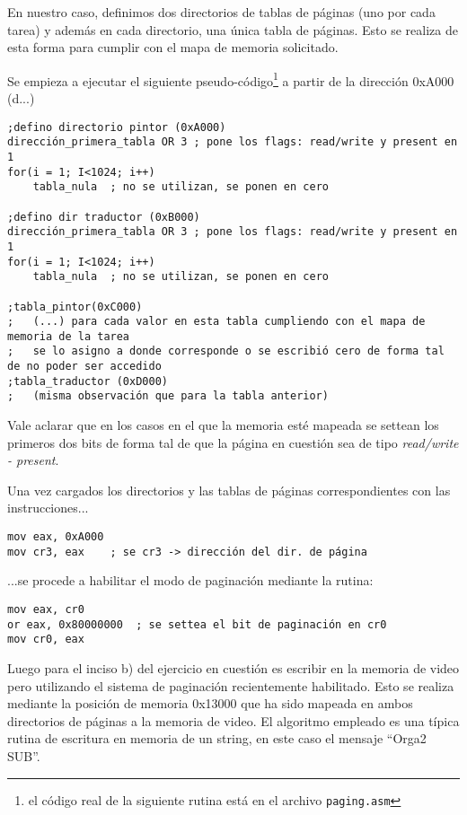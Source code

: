 En nuestro caso, definimos dos directorios de tablas de páginas (uno por cada tarea) y además en cada directorio, una única tabla de páginas. Esto se realiza de esta forma para cumplir con el mapa de memoria solicitado.

Se empieza a ejecutar el siguiente pseudo-código\footnote{el código real de la siguiente rutina está en el archivo \texttt{paging.asm}} a partir de la dirección 0xA000 (d...)

\pagebreak

\begin{verbatim}
;defino directorio pintor (0xA000)
dirección_primera_tabla OR 3 ; pone los flags: read/write y present en 1
for(i = 1; I<1024; i++)
	tabla_nula	; no se utilizan, se ponen en cero

;defino dir traductor (0xB000)
dirección_primera_tabla OR 3 ; pone los flags: read/write y present en 1
for(i = 1; I<1024; i++)
	tabla_nula	; no se utilizan, se ponen en cero

;tabla_pintor(0xC000)
;	(...) para cada valor en esta tabla cumpliendo con el mapa de memoria de la tarea
;	se lo asigno a donde corresponde o se escribió cero de forma tal de no poder ser accedido
;tabla_traductor (0xD000)
;	(misma observación que para la tabla anterior)
\end{verbatim}


Vale aclarar que en los casos en el que la memoria esté mapeada se settean los primeros dos bits de forma tal de que la página en cuestión sea de tipo \emph{read/write - present}.

Una vez cargados los directorios y las tablas de páginas correspondientes con las instrucciones...
\begin{verbatim}
mov eax, 0xA000 
mov cr3, eax	; se cr3 -> dirección del dir. de página
\end{verbatim}

...se procede a habilitar el modo de paginación mediante la rutina:
\begin{verbatim}
mov eax, cr0
or eax, 0x80000000 	; se settea el bit de paginación en cr0
mov cr0, eax
\end{verbatim}

Luego para el inciso b) del ejercicio en cuestión es escribir en la memoria de video pero utilizando el sistema de paginación recientemente habilitado. Esto se realiza mediante la posición de memoria 0x13000 que ha sido mapeada en ambos directorios de páginas a la memoria de video. El algoritmo empleado es una típica rutina de escritura en memoria de un string, en este caso el mensaje ``Orga2 SUB''. 

